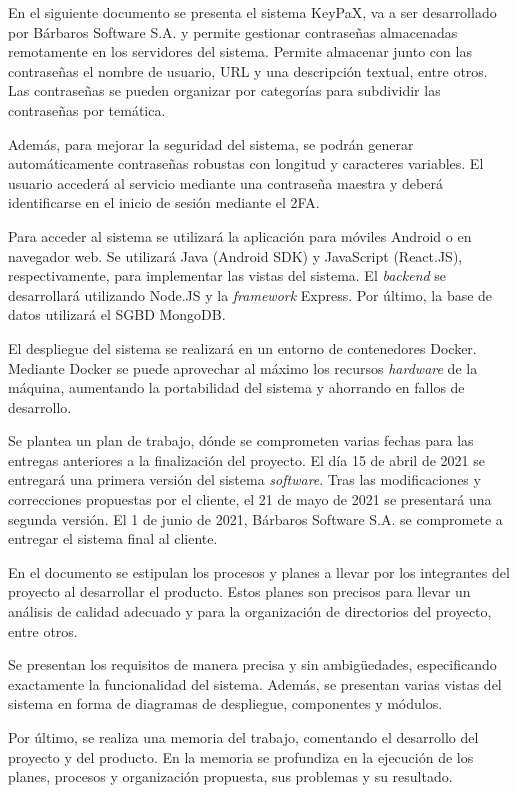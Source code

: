 \documentclass{article}
\begin{document}
En el siguiente documento se presenta el sistema KeyPaX, va a ser desarrollado por Bárbaros Software S.A. y permite gestionar contraseñas almacenadas remotamente en los servidores del sistema. Permite almacenar junto con las contraseñas el nombre de usuario, URL y una descripción textual, entre otros. Las contraseñas se pueden organizar por categorías para subdividir las contraseñas por temática.
 
Además, para mejorar la seguridad del sistema, se podrán generar automáticamente contraseñas robustas con longitud y caracteres variables. El usuario accederá al servicio mediante una contraseña maestra y deberá identificarse en el inicio de sesión mediante el 2FA.
 
Para acceder al sistema se utilizará la aplicación para móviles Android o en navegador web. Se utilizará Java (Android SDK) y JavaScript (React.JS), respectivamente, para implementar las vistas del sistema. El \textit{backend} se desarrollará utilizando Node.JS y la \textit{framework} Express. Por último, la base de datos utilizará el SGBD MongoDB.
 
El despliegue del sistema se realizará en un entorno de contenedores Docker. Mediante Docker se puede aprovechar al máximo los recursos \textit{hardware} de la máquina, aumentando la portabilidad del sistema y ahorrando en fallos de desarrollo.
 
Se plantea un plan de trabajo, dónde se comprometen varias fechas para las entregas anteriores a la finalización del proyecto.  El día 15 de abril de 2021 se entregará una primera versión del sistema \textit{software}. Tras las modificaciones y correcciones propuestas por el cliente, el 21 de mayo de 2021 se presentará una segunda versión. El 1 de junio de 2021, Bárbaros Software S.A. se compromete a entregar el sistema final al cliente.
 
En el documento se estipulan los procesos y planes a llevar por los integrantes del proyecto al desarrollar el producto. Estos planes son precisos para llevar un análisis de calidad adecuado y para la organización de directorios del proyecto, entre otros.
 
Se presentan los requisitos de manera precisa y sin ambigüedades, especificando exactamente la funcionalidad del sistema. Además, se presentan varias vistas del sistema en forma de diagramas de despliegue, componentes y módulos.
 
Por último, se realiza una memoria del trabajo, comentando el desarrollo del proyecto y del producto. En la memoria se profundiza en la ejecución de los planes, procesos y organización propuesta, sus problemas y su resultado.
 
\end{document}
